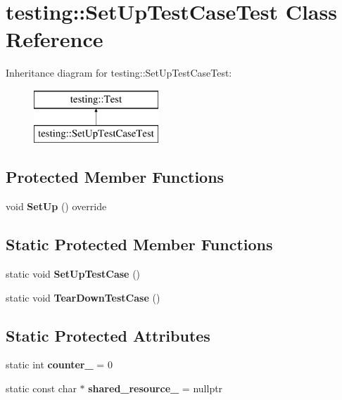 \hypertarget{classtesting_1_1SetUpTestCaseTest}{}\section{testing\+:\+:Set\+Up\+Test\+Case\+Test Class Reference}
\label{classtesting_1_1SetUpTestCaseTest}
Inheritance diagram for testing\+:\+:Set\+Up\+Test\+Case\+Test\+:\begin{figure}[H]
\begin{center}
\leavevmode
\includegraphics[height=2.000000cm]{classtesting_1_1SetUpTestCaseTest}
\end{center}
\end{figure}
\subsection*{Protected Member Functions}
\begin{DoxyCompactItemize}
\item 
\mbox{\label{classtesting_1_1SetUpTestCaseTest_a5ceda206e569e436d71b2084333d23b1}} 
void {\bfseries Set\+Up} () override
\end{DoxyCompactItemize}
\subsection*{Static Protected Member Functions}
\begin{DoxyCompactItemize}
\item 
\mbox{\label{classtesting_1_1SetUpTestCaseTest_a50732abc0bcb3725e6dfd6a2d487e944}} 
static void {\bfseries Set\+Up\+Test\+Case} ()
\item 
\mbox{\label{classtesting_1_1SetUpTestCaseTest_abdc133cd161ff2fa317f489da9bdccf3}} 
static void {\bfseries Tear\+Down\+Test\+Case} ()
\end{DoxyCompactItemize}
\subsection*{Static Protected Attributes}
\begin{DoxyCompactItemize}
\item 
\mbox{\label{classtesting_1_1SetUpTestCaseTest_a5b6e811128d35389be49f6569bf93817}} 
static int {\bfseries counter\+\_\+} = 0
\item 
\mbox{\label{classtesting_1_1SetUpTestCaseTest_a904e77fd9a628b6a9aca0280665fd040}} 
static const char $\ast$ {\bfseries shared\+\_\+resource\+\_\+} = nullptr
\end{DoxyCompactItemize}
